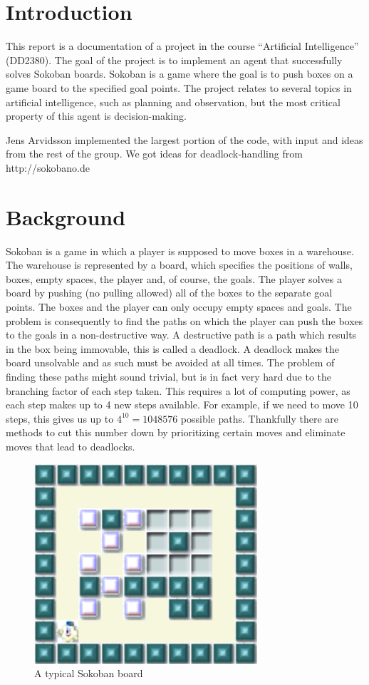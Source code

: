 \documentclass[article,11pt]{article}
\begin{document}
\newpage

\section{Introduction}
This report is a documentation of a project in the course “Artificial
Intelligence” (DD2380). The goal of the project is to implement an
agent that successfully solves Sokoban boards. Sokoban is a game where
the goal is to push boxes on a game board to the specified goal
points. The project relates to several topics in artificial
intelligence, such as planning and observation, but the most critical
property of this agent is decision-making.


Jens Arvidsson implemented the largest portion of the code, with input
and ideas from the rest of the group. We got ideas for
deadlock-handling from http://sokobano.de


\section{Background}

Sokoban is a game in which a player is supposed to move boxes in a
warehouse. The warehouse is represented by a board, which specifies
the positions of walls, boxes, empty spaces, the player and, of
course, the goals. The player solves a board by pushing (no pulling
allowed) all of the boxes to the separate goal points. The boxes and
the player can only occupy empty spaces and goals. The problem is
consequently to find the paths on which the player can push the boxes
to the goals in a non-destructive way. A destructive path is a path
which results in the box being immovable, this is called a deadlock. A
deadlock makes the board unsolvable and as such must be avoided at all
times. The problem of finding these paths might sound trivial, but is
in fact very hard due to the branching factor of each step taken. This
requires a lot of computing power, as each step makes up to 4 new
steps available. For example, if we need to move 10 steps, this gives
us up to $4^10 = 1048576$ possible paths. Thankfully there are methods
to cut this number down by prioritizing certain moves and eliminate
moves that lead to deadlocks.
\begin{figure}[h]
\includegraphics{exampleboard.pdf}
\caption{A typical Sokoban board}
\end{figure}
\end{document}

